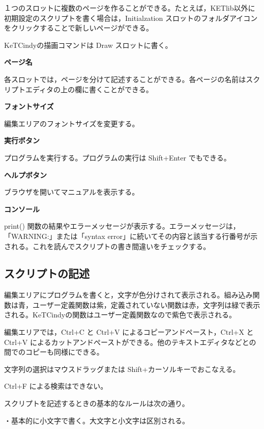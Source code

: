 \documentclass[papersize,a4paper,12pt,uplatex]{jsarticle}
\begin{document}
１つのスロットに複数のページを作ることができる。たとえば，KETlib以外に初期設定のスクリプトを書く場合は，Initialzation スロットのフォルダアイコンをクリックすることで新しいページができる。

KeTCindyの描画コマンドは Draw スロットに書く。

\vspace{\baselineskip}
{\bf  ページ名}

各スロットでは，ページを分けて記述することができる。各ページの名前はスクリプトエディタの上の欄に書くことができる。

\vspace{\baselineskip}
{\bf  フォントサイズ}

編集エリアのフォントサイズを変更する。

\vspace{\baselineskip}
{\bf  実行ボタン}

プログラムを実行する。プログラムの実行は Shift+Enter でもできる。

\vspace{\baselineskip}
{\bf  ヘルプボタン}

ブラウザを開いてマニュアルを表示する。

\vspace{\baselineskip}
{\bf  コンソール}

print() 関数の結果やエラーメッセージが表示する。エラーメッセージは，「WARNING:」または「syntax error」に続いてその内容と該当する行番号が示される。これを読んでスクリプトの書き間違いをチェックする。

\subsection{スクリプトの記述}
編集エリアにプログラムを書くと，文字が色分けされて表示される。組み込み関数は青，ユーザー定義関数は紫，定義されていない関数は赤，文字列は緑で表示される。KeTCindyの関数はユーザー定義関数なので紫色で表示される。

編集エリアでは，Ctrl+C と Ctrl+V によるコピーアンドペースト，Ctrl+X と Ctrl+V によるカットアンドぺーストができる。他のテキストエディタなどとの間でのコピーも同様にできる。

文字列の選択はマウスドラッグまたは Shift+カーソルキーでおこなえる。

Ctrl+F による検索はできない。

スクリプトを記述するときの基本的なルールは次の通り。

\vspace{\baselineskip}
・基本的に小文字で書く。大文字と小文字は区別される。
\end{document}
